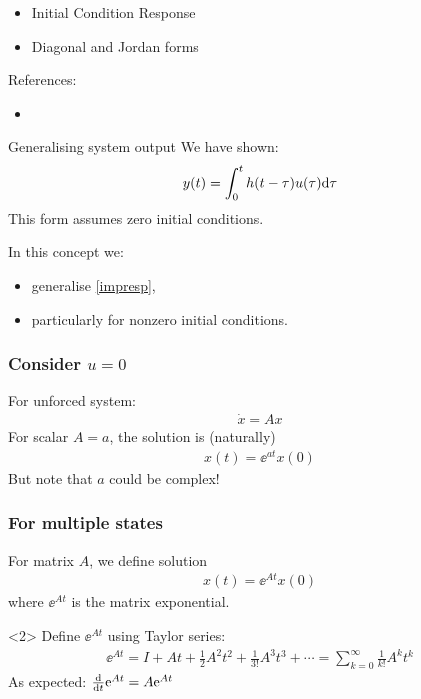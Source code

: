 \documentclass[10pt]{beamer-control}
\begin{document}

\begin{SUMMARY}
  \begin{itemize}
    \item Initial Condition Response
    \item Diagonal and Jordan forms
  \end{itemize}
  \vfill References:
  \begin{itemize}
    \item \astrom[§6.2]
  \end{itemize}
\end{SUMMARY}




\begin{frame}{Generalising system output}
  We have shown:
  \begin{align}\label{eq:impresp}
    y(t) = \int^t_0 h(t-\tau)u(\tau)\mathrm{d}\tau
  \end{align}
  This form assumes zero initial conditions.

  In this concept we:
  \begin{itemize}
    \item generalise  \eqref{impresp},
    \item particularly for nonzero initial conditions.
  \end{itemize}
\end{frame}

\begin{frame}
  \frametitle{Consider $u=0$}
  For unforced system:
  \begin{align}
    \dot x = A x
  \end{align}
  For scalar $A=a$, the solution is (naturally)
  \begin{align}
    x(t) = \ee^{at}x(0)
  \end{align}
  But note that $a$ could be complex!
\end{frame}

\begin{frame}
  \frametitle{For multiple states}

  For matrix $A$, we define solution
  \begin{align}
    x(t) = \ee^{At} x(0)
  \end{align}
  where $\ee^{At}$ is the \alert{matrix exponential}.
  \bigskip

  \begin{uncoverenv}<2>
    Define $\ee^{At}$ using Taylor series:
    \begin{align}
      \ee^{At} = I + At + \tfrac12 A^2t^2 + \tfrac{1}{3!}A^3t^3 + \cdots = \sum_{k=0}^{\infty} \tfrac{1}{k!}A^kt^k
    \end{align}
    As expected: $\frac{\mathrm{d} }{\mathrm{d} t} \mathrm{e}^{At} = A \mathrm{e}^{At}$
  \end{uncoverenv}
\end{frame}
\end{document}
